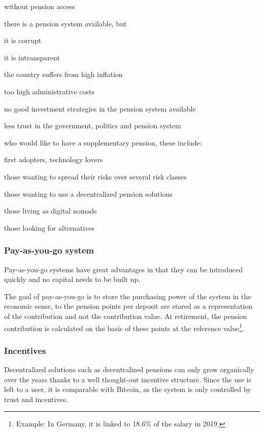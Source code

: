 \begin{compactitem}
\item without pension access
\item there is a pension system available, but
 \begin{compactitem}
 \item it is corrupt
 \item it is intransparent
 \item the country suffers from high inflation
 \item too high administrative costs
 \item no good investment strategies in the pension system available
 \item less trust in the government, politics and pension system
 \end{compactitem}
\item who would like to have a supplementary pension, these include: 
 \begin{compactitem}
 \item first adopters, technology lovers
 \item those wanting to spread their risks over several risk classes
 \item those wanting to use a decentralized pension solutions
 \item those living as digital nomads
 \item those looking for alternatives
 \end{compactitem}
\end{compactitem}

\subsubsection{Pay-as-you-go system}


Pay-as-you-go systems have great advantages in that they can be introduced quickly and no capital needs to be built up.

The goal of pay-as-you-go is to store the purchasing power of the system in the economic sense, to the pension points per deposit are stored as a representation of the contribution and not the contribution value.
At retirement, the pension contribution is calculated on the basis of these points at the reference value\footnote{Example: In Germany, it is linked to 18.6\% of the salary in 2019.}.


\subsubsection{Incentives}
Decentralized solutions such as decentralized pensions can only grow organically over the years thanks to a well thought-out incentive structure. Since the use is left to a user, it is comparable with Bitcoin\cite{nakamoto2012bitcoin}, as the system is only controlled by trust and incentives.

